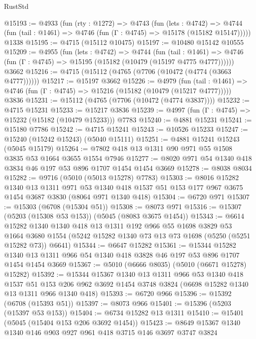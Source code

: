 \begin{lexlean}{RustStd}
\begin{coremodule}
@15193 := @4933
    (fun (rty : @1272) =>
    @4743
      (fun (lets : @4742) =>
      @4744 (fun (tail : @1461) => @4746 (fun (Γ : @4745) => @15178 (@15182 @15147)))))
    @1338
@15195 := @4715 (@15112 @10475)
@15197 := @10480 @15142 @10555
@15209 := @4955
    (fun (lets : @4742) =>
    @4744
      (fun (tail : @1461) =>
      @4746 (fun (Γ : @4745) => @15195 (@15182 (@10479 (@15197 @4775 @4777))))))
    @3662
@15216 := @4715 (@15112 (@4765 (@7706 (@10472 (@4774 (@3663 @4777))))))
@15217 := @15197 @3662
@15226 := @4979
    (fun (tail : @1461) => @4746 (fun (Γ : @4745) => @15216 (@15182 (@10479 (@15217 @4777)))))
    @3836
@15231 := @15112 (@4765 (@7706 (@10472 (@4774 @3837))))
@15232 := @4715 @15231
@15233 := @15217 @3836
@15239 := @4997 (fun (Γ : @4745) => @15232 (@15182 (@10479 @15233))) @7783
@15240 := @4881 @15231
@15241 := @15180 @7786
@15242 := @4715 @15241
@15243 := @10526 @15233
@15247 := @15240 (@15242 @15243) (@5040 @15111)
@15251 := @4881 @15241 @15243 (@5045 @15179)
@15264 := @7802 @418 @13 @1311 @90 @971 @55 @1508 @3835 @53 @1664 @3655 @1554 @7946
@15277 := @8020 @971 @54 @1340 @418 @3834 @46 @197 @53 @896 @1707 @1454 @1454 @3669
@15278 := @8038 @8034
@15282 := @9716 (@5010 (@5013 @15278) @7783)
@15303 := @8016
    @15282
    @1340
    @13
    @1311
    @971
    @53
    @1340
    @418
    @1537
    @51
    @153
    @177
    @967
    @3675
    @1454
    @3687
    @3830
    (@8064 @971 @1340 @418)
@15304 := @6720 @971
@15307 := @15303 (@6708 (@15304 @51))
@15308 := @8073 @971
@15316 := @15307 (@5203 (@15308 @53 @153)) (@5045 (@8083 @3675 @1454))
@15343 := @6614
    @15282
    @1340
    @1340
    @418
    @13
    @1311
    @192
    @966
    @55
    @1698
    @3829
    @53
    @1664
    @3680
    @1554
    (@5242 @15282 @1340 @73 @13 @73 @1698 (@5250 (@5251 @15282 @73)) @6641)
@15344 := @6647 @15282
@15361 := @15344
    @15282
    @1340
    @13
    @1311
    @966
    @54
    @1340
    @418
    @3828
    @46
    @197
    @53
    @896
    @1707
    @1454
    @1454
    @3669
@15367 := @5010 (@6666 @8035) (@5010 (@6671 @15278) @15282)
@15392 := @15344
    @15367
    @1340
    @13
    @1311
    @966
    @53
    @1340
    @418
    @1537
    @51
    @153
    @206
    @962
    @3692
    @1454
    @3748
    @3824
    (@6698 @15282 @1340 @13 @1311 @966 @1340 @418)
@15393 := @6720 @966
@15396 := @15392 (@6708 (@15393 @51))
@15397 := @8073 @966
@15401 := @15396 (@5203 (@15397 @53 @153))
@15404 := @6734 @15282 @13 @1311
@15410 := @15401 (@5045 (@15404 @153 @206 @3692 @1454))
@15423 := @8649 @15367 @1340 @1340 @146 @903 @927 @961 @418 @3715 @146 @3697 @3747 @3824

\end{coremodule}
\end{lexlean}

